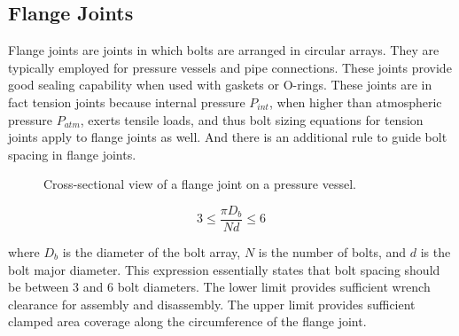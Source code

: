 \documentclass[
10pt,
a4paper,
openany,
svgnames,
]{book}
\begin{document}
\subsection{Flange Joints}

Flange joints are joints in which bolts are arranged in circular arrays. They are typically employed for pressure vessels and pipe connections. These joints provide good sealing capability when used with gaskets or O-rings. These joints are in fact tension joints because internal pressure $P_{int}$, when higher than atmospheric pressure $P_{atm}$, exerts tensile loads, and thus bolt sizing equations for tension joints apply to flange joints as well. And there is an additional rule to guide bolt spacing in flange joints. 

\begin{figure}[h]
  \centering
  \caption{Cross-sectional view of a flange joint on a pressure vessel.}
\end{figure}

\begin{equation}
  3 \leqslant \frac{\pi D_b}{Nd} \leqslant 6
\end{equation}

where $D_b$ is the diameter of the bolt array, $N$ is the number of bolts, and $d$ is the bolt major diameter. This expression essentially states that bolt spacing should be between 3 and 6 bolt diameters. The lower limit provides sufficient wrench clearance for assembly and disassembly. The upper limit provides sufficient clamped area coverage along the circumference of the flange joint.
\end{document}
